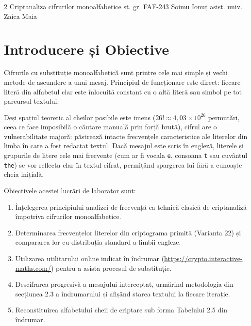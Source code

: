 \documentclass{labreport}
\begin{document}
\hypersetup{pageanchor=false}
\labtitle
    {2}
    {Criptanaliza cifrurilor monoalfabetice}
    {st. gr. FAF-243}
    {Șoimu Ionuț}
    {asist. univ.\\[0.15cm] Zaica Maia}

\tableofcontents
\newpage
\hypersetup{pageanchor=true}
\setcounter{page}{1}

\section{Introducere și Obiective}

Cifrurile cu substituție monoalfabetică sunt printre cele mai simple și vechi metode de ascundere a unui mesaj. Principiul de funcționare este direct: fiecare literă din alfabetul clar este înlocuită constant cu o altă literă sau simbol pe tot parcursul textului.

Deși spațiul teoretic al cheilor posibile este imens ($26! \approx 4{,}03 \times 10^{26}$ permutări, ceea ce face imposibilă o căutare manuală prin forță brută), cifrul are o vulnerabilitate majoră: păstrează intacte frecvențele caracteristice ale literelor din limba în care a fost redactat textul. Dacă mesajul este scris în engleză, literele și grupurile de litere cele mai frecvente (cum ar fi vocala \texttt{e}, consoana \texttt{t} sau cuvântul \texttt{the}) se vor reflecta clar în textul cifrat, permițând spargerea lui fără a cunoaște cheia inițială.

Obiectivele acestei lucrări de laborator sunt:
\begin{enumerate}[leftmargin=*]
    \item Înțelegerea principiului analizei de frecvență ca tehnică clasică de criptanaliză împotriva cifrurilor monoalfabetice.
    \item Determinarea frecvențelor literelor din criptograma primită (Varianta 22) și compararea lor cu distribuția standard a limbii engleze.
    \item Utilizarea utilitarului online indicat în îndrumar (\url{https://crypto.interactive-maths.com/}) pentru a asista procesul de substituție.
    \item Descifrarea progresivă a mesajului interceptat, urmărind metodologia din secțiunea 2.3 a îndrumarului și afișând starea textului la fiecare iterație.
    \item Reconstituirea alfabetului cheii de criptare sub forma Tabelului 2.5 din îndrumar.
\end{enumerate}
\end{document}
